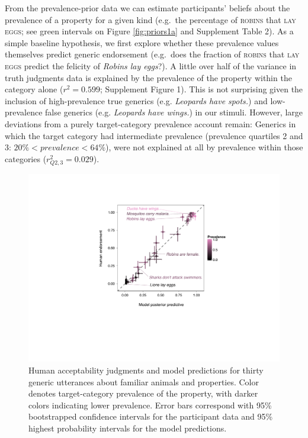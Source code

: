 \documentclass[10pt,letterpaper]{article}
\begin{document}
From the prevalence-prior data we can estimate participants' beliefs about the prevalence of a property for a given kind (e.g.~the percentage of \textsc{robins} that \textsc{lay eggs}; see green intervals on Figure \ref{fig:priors1a} and  Supplement Table 2).
As a simple baseline hypothesis, we first explore whether these prevalence values themselves predict generic endorsement (e.g.~does the fraction of \textsc{robins} that \textsc{lay eggs} predict the felicity of \emph{Robins lay eggs}?).
A little over half of the variance in truth judgments data is explained by the prevalence of the property within the category alone ($r^2 = 0.599$; Supplement Figure 1). 
This is not surprising given the inclusion of high-prevalence true generics (e.g. \emph{Leopards have spots.}) and low-prevalence false generics (e.g. \emph{Leopards have wings.}) in our stimuli. 
However, large deviations from a purely target-category prevalence account remain: Generics in which the target category had intermediate prevalence (prevalence quartiles 2 and 3: $ 20\% < prevalence < 64\%$), were not explained at all by prevalence within those categories ($r_{Q2,3}^2 = 0.029$).

\begin{figure}
\centering
    \includegraphics[width=0.7\columnwidth]{truthjudge-scatter-wLabels.pdf}
    \caption{Human acceptability judgments and model predictions for thirty generic utterances about familiar animals and properties. 
    Color denotes target-category prevalence of the property, with darker colors indicating lower prevalence. 
    Error bars correspond with 95\% bootstrapped confidence intervals for the participant data and 95\% highest probability intervals for the model predictions.
    }
  \label{fig:modeldataBars}
\end{figure}
\end{document}
